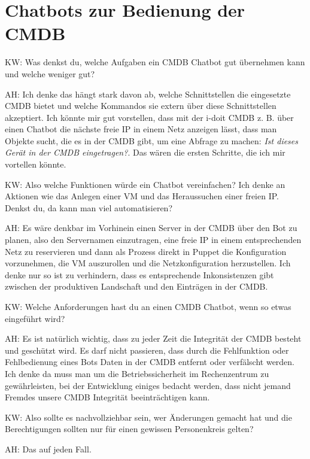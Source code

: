 \section*{Chatbots zur Bedienung der CMDB}

\begin{list}{X:}{\setlength{\labelsep}{5mm}}
\item [KW:] Was denkst du, welche Aufgaben ein CMDB Chatbot gut übernehmen kann und welche weniger gut?
\item [AH:] Ich denke das hängt stark davon ab, welche Schnittstellen die eingesetzte CMDB bietet und welche Kommandos sie extern über diese Schnittstellen akzeptiert. Ich könnte mir gut vorstellen, dass mit der i-doit CMDB z. B. über einen Chatbot die nächste freie IP in einem Netz anzeigen lässt, dass man Objekte sucht, die es in der CMDB gibt,  um eine Abfrage zu machen: \textit{Ist dieses Gerät in der CMDB eingetragen?}. Das wären die ersten Schritte, die ich mir vortellen könnte.
\item [KW:] Also welche Funktionen würde ein Chatbot vereinfachen? Ich denke an Aktionen wie das Anlegen einer VM und das Heraussuchen einer freien IP. Denkst du, da kann man viel automatisieren?
\item [AH:] Es wäre denkbar im Vorhinein einen Server in der CMDB über den Bot zu planen, also den Servernamen einzutragen, eine freie IP in einem entsprechenden Netz zu reservieren und dann als Prozess direkt in Puppet die Konfiguration vorzunehmen, die VM auszurollen und die Netzkonfiguration herzustellen. Ich denke nur so ist zu verhindern, dass es entsprechende Inkonsistenzen gibt zwischen der produktiven Landschaft und den Einträgen in der CMDB.
\item [KW:] Welche Anforderungen hast du an einen CMDB Chatbot, wenn so etwas eingeführt wird?
\item [AH:] Es ist natürlich wichtig, dass zu jeder Zeit die Integrität der CMDB besteht und geschützt wird. Es darf nicht passieren, dass durch die Fehlfunktion oder Fehlbedienung eines Bots Daten in der CMDB entfernt oder verfälscht werden. Ich denke da muss man um die Betriebssicherheit im Rechenzentrum zu gewährleisten, bei der Entwicklung einiges bedacht werden, dass nicht jemand Fremdes unsere CMDB Integrität beeinträchtigen kann.
\item [KW:] Also sollte es nachvollziehbar sein, wer Änderungen gemacht hat und die Berechtigungen sollten nur für einen gewissen Personenkreis gelten?
\item [AH:] Das auf jeden Fall.

\end{list}
